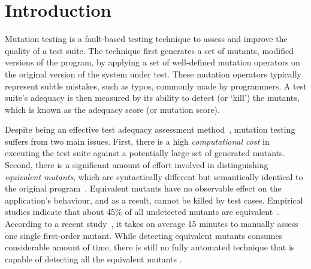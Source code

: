 \section{Introduction} \label{intro}
Mutation testing is a fault-based testing technique to assess and improve the quality of a test suite.
The technique first generates a set of mutants, \ie modified versions of the program, by applying a set of well-defined mutation operators on the original version of the system under test. 
These mutation operators typically represent subtle mistakes, such as typos, commonly made by programmers. A test suite's adequacy is then measured by its ability to detect (or `kill') the mutants, which is known as the adequacy score (or mutation score).

Despite being an effective test adequacy assessment method~\cite{andrews:icse05,jia:tse10}, mutation testing suffers from two main issues.  First, there is a high \emph{computational cost} in executing the test suite against a potentially large set of generated mutants. Second, there is a significant amount of effort  involved in distinguishing \emph{equivalent mutants}, which are syntactically different but semantically identical to the original program~\cite{budd:acta82}.  Equivalent mutants have no observable effect on the application's behaviour, and as a result, cannot be killed by test cases. Empirical studies indicate that about 45\% of all undetected mutants are equivalent~\cite{schuler:tvr12, madeyski:tse13}. 
According to a recent study~\cite{madeyski:tse13}, it takes on average 15 minutes to manually assess one single first-order mutant. While detecting equivalent mutants consumes considerable amount of time, there is still no fully automated technique that is capable of detecting all the equivalent mutants \cite{madeyski:tse13}. %


